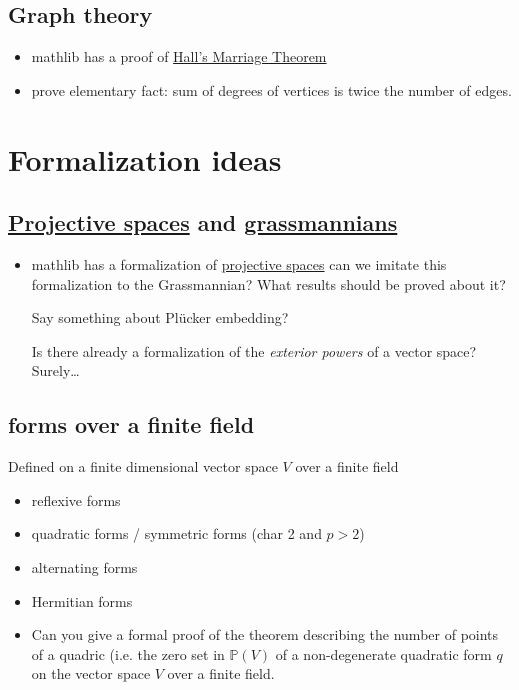 \documentclass[11pt]{article}
\numberwithin{equation}{section}
\begin{document}
\subsection{Graph theory}
\label{sec:graph-theory}
\begin{itemize}
\item mathlib has a proof of \href{https://leanprover-community.github.io/mathlib4\_docs/Mathlib/Combinatorics/Hall/Finite.html}{Hall's Marriage Theorem}
\item prove elementary fact: sum of degrees of vertices is twice the
number of edges.
\end{itemize}
\section{Formalization ideas}
\label{sec:formalization-ideas}
\subsection{\href{https://en.wikipedia.org/wiki/Projective\_space}{Projective spaces} and \href{https://en.wikipedia.org/wiki/Grassmannian}{grassmannians}}
\label{sec:projective-spaces-and-grassmannians}
\begin{itemize}
\item mathlib has a formalization of \href{https://leanprover-community.github.io/mathlib4\_docs/Mathlib/LinearAlgebra/Projectivization/Basic.html\#Projectivization}{projective spaces} can we imitate this
formalization to the Grassmannian? What results should be proved
about it?

Say something about Plücker embedding?

Is there already a formalization of the \emph{exterior powers} of a vector
space? Surely\ldots{}
\end{itemize}
\subsection{forms over a finite field}
\label{sec:forms-over-a-finite-field}
Defined on a finite dimensional vector space \(V\) over a finite field

\begin{itemize}
\item reflexive forms
\item quadratic forms / symmetric forms (char 2 and \(p>2\))
\item alternating forms
\item Hermitian forms

\item Can you give a formal proof of the theorem describing the number of
points of a quadric (i.e. the zero set in \(\mathbb{P}(V)\) of a
non-degenerate quadratic form \(q\) on the vector space \(V\) over a
finite field.
\end{itemize}
\end{document}

